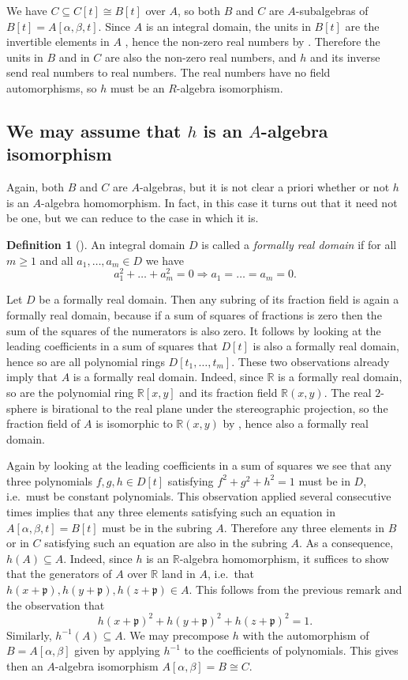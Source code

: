 \documentclass[A4paper, 12pt, british, reqno]{amsart}
\newcommand{\R}{\mathbb{R}} %
\newcommand{\p}{\mathfrak{p}}
\theoremstyle{plain}
\theoremstyle{definition}
\newtheorem{defn}[thm]{Definition}
\theoremstyle{remark}
\theoremstyle{plain}
\theoremstyle{definition}
\theoremstyle{remark}
\theoremstyle{plain}
\theoremstyle{definition}
\theoremstyle{remark}
\begin{document}
We have $C\subseteq C[t]\cong B[t]$ over $A$, so both $B$ and $C$ are $A$-subalgebras of $B[t]=A[\alpha,\beta,t]$.
Since $A$ is an integral domain, the units in $B[t]$ are the invertible elements in $A$ \cite[Exercise 2 of \S 1]{am69}, hence the non-zero real numbers by .
Therefore the units in $B$ and in $C$ are also the non-zero real numbers, and $h$ and its inverse send real numbers to real numbers.
The real numbers have no field automorphisms, so $h$ must be an $R$-algebra isomorphism.

\subsection{We may assume that $h$ is an $A$-algebra isomorphism}
Again, both $B$ and $C$ are $A$-algebras, but it is not clear a priori whether or not $h$ is an $A$-algebra homomorphism.
In fact, in this case it turns out that it need not be one, but we can reduce to the case in which it is.

\begin{defn}[{\cite[\S 10.1.5]{fre17}}]
    An integral domain $D$ is called a \textit{formally real domain} if for all $m\geqslant 1$ and all $a_{1},\ldots,a_{m}\in D$ we have
    \[ a_{1}^{2}+\ldots+a_{m}^{2}=0 \Rightarrow a_{1}=\ldots=a_{m}=0. \]
\end{defn}

Let $D$ be a formally real domain.
Then  any subring of its fraction field is again a formally real domain, because if a sum of squares of fractions is zero then the sum of the squares of the numerators is also zero.
It follows by looking at the leading coefficients in a sum of squares that $D[t]$ is also a formally real domain, hence so are all polynomial rings $D[t_{1},\ldots,t_{m}]$.
These two observations already imply that $A$ is a formally real domain.
Indeed, since $\R$ is a formally real domain, so are the polynomial ring $\R[x,y]$ and its fraction field $\R(x,y)$.
The real $2$-sphere is birational to the real plane under the stereographic projection, so the fraction field of $A$ is isomorphic to $\R(x,y)$ by \cite[Lemma 9.33]{gw10}, hence also a formally real domain.

Again by looking at the leading coefficients in a sum of squares we see that any three polynomials $f,g,h\in D[t]$ satisfying $f^{2}+g^{2}+h^{2}=1$ must be in $D$, i.e.~must be constant polynomials.
This observation applied several consecutive times implies that any three elements satisfying such an equation in $A[\alpha,\beta,t]=B[t]$ must be in the subring $A$.
Therefore any three elements in $B$ or in $C$ satisfying such an equation are also in the subring $A$.
As a consequence, $h(A)\subseteq A$.
Indeed, since $h$ is an $\R$-algebra homomorphism, it suffices to show that the generators of $A$ over $\R$ land in $A$, i.e.~that $h(x+\p),h(y+\p),h(z+\p)\in A$.
This follows from the previous remark and the observation that
\[ h(x+\p)^{2}+h(y+\p)^{2}+h(z+\p)^{2}=1. \]
Similarly, $h^{-1}(A)\subseteq A$.
We may precompose $h$ with the automorphism of $B=A[\alpha,\beta]$ given by applying $h^{-1}$ to the coefficients of polynomials.
This gives then an $A$-algebra isomorphism $A[\alpha,\beta]=B\cong C$.
\end{document}
